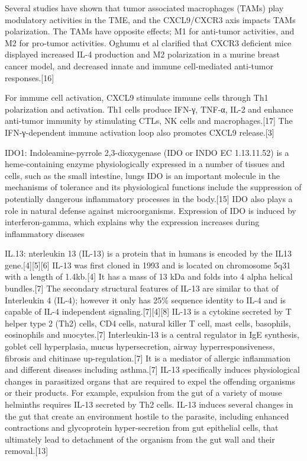 \documentclass[
]{article}
\begin{document}
Several studies have shown that tumor associated macrophages (TAMs) play
modulatory activities in the TME, and the CXCL9/CXCR3 axis impacts TAMs
polarization. The TAMs have opposite effects; M1 for anti-tumor
activities, and M2 for pro-tumor activities. Oghumu et al clarified that
CXCR3 deficient mice displayed increased IL-4 production and M2
polarization in a murine breast cancer model, and decreased innate and
immune cell-mediated anti-tumor responses.{[}16{]}

For immune cell activation, CXCL9 stimulate immune cells through Th1
polarization and activation. Th1 cells produce IFN-γ, TNF-α, IL-2 and
enhance anti-tumor immunity by stimulating CTLs, NK cells and
macrophages.{[}17{]} The IFN-γ-dependent immune activation loop also
promotes CXCL9 release.{[}3{]}

IDO1: Indoleamine-pyrrole 2,3-dioxygenase (IDO or INDO EC 1.13.11.52) is
a heme-containing enzyme physiologically expressed in a number of
tissues and cells, such as the small intestine, lungs IDO is an
important molecule in the mechanisms of tolerance and its physiological
functions include the suppression of potentially dangerous inflammatory
processes in the body.{[}15{]} IDO also plays a role in natural defense
against microorganisms. Expression of IDO is induced by
interferon-gamma, which explains why the expression increases during
inflammatory diseases

IL.13: nterleukin 13 (IL-13) is a protein that in humans is encoded by
the IL13 gene.{[}4{]}{[}5{]}{[}6{]} IL-13 was first cloned in 1993 and
is located on chromosome 5q31 with a length of 1.4kb.{[}4{]} It has a
mass of 13 kDa and folds into 4 alpha helical bundles.{[}7{]} The
secondary structural features of IL-13 are similar to that of
Interleukin 4 (IL-4); however it only has 25\% sequence identity to IL-4
and is capable of IL-4 independent signaling.{[}7{]}{[}4{]}{[}8{]} IL-13
is a cytokine secreted by T helper type 2 (Th2) cells, CD4 cells,
natural killer T cell, mast cells, basophils, eosinophils and
nuocytes.{[}7{]} Interleukin-13 is a central regulator in IgE synthesis,
goblet cell hyperplasia, mucus hypersecretion, airway
hyperresponsiveness, fibrosis and chitinase up-regulation.{[}7{]} It is
a mediator of allergic inflammation and different diseases including
asthma.{[}7{]} IL-13 specifically induces physiological changes in
parasitized organs that are required to expel the offending organisms or
their products. For example, expulsion from the gut of a variety of
mouse helminths requires IL-13 secreted by Th2 cells. IL-13 induces
several changes in the gut that create an environment hostile to the
parasite, including enhanced contractions and glycoprotein
hyper-secretion from gut epithelial cells, that ultimately lead to
detachment of the organism from the gut wall and their removal.{[}13{]}
\end{document}
